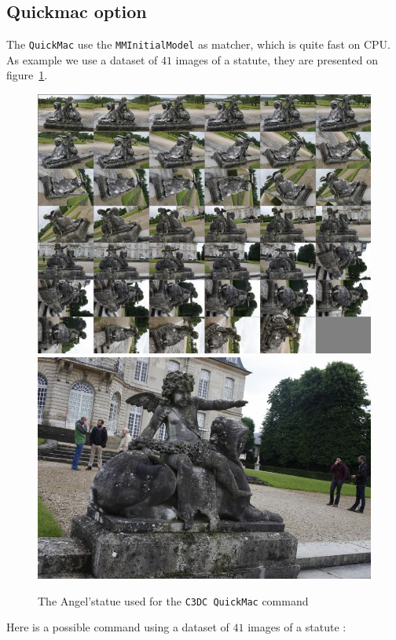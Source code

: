 \subsection{Quickmac option}

The {\tt QuickMac} use the {\tt MMInitialModel} as matcher, which is quite fast on CPU.
As example we use  a dataset of $41$ images of a statute, they are presented on figure~\ref{FIG:Angel:Flog}.


\begin{figure}
\begin{center}
\includegraphics[width=120mm]{FIGS/Ange/Panel.jpg}
\includegraphics[width=120mm]{FIGS/Ange/SMALL_MG_1044.JPG}
\end{center}
\caption{The Angel'statue used for the {\tt C3DC QuickMac} command}
\label{FIG:Angel:Flog}
\end{figure}


Here is a possible command using a dataset of $41$ images of a statute :


